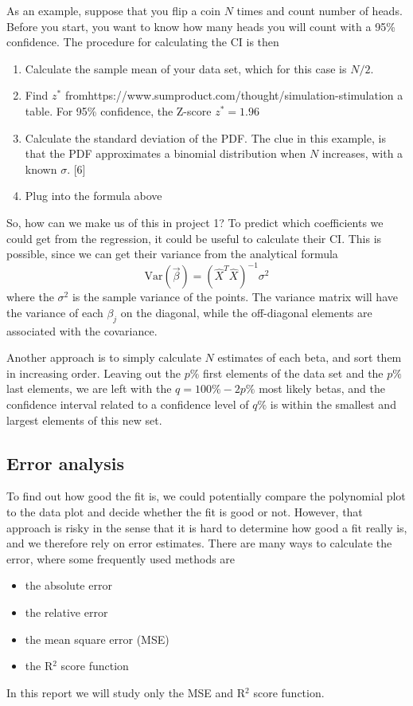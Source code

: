 As an example, suppose that you flip a coin $N$ times and count number of heads. Before you start, you want to know how many heads you will count with a 95\% confidence. The procedure for calculating the CI is then
\begin{enumerate}
	\item Calculate the sample mean of your data set, which for this case is $N/2$.
	\item Find $z^*$ fromhttps://www.sumproduct.com/thought/simulation-stimulation a table. For 95\% confidence, the Z-score $z^*=1.96$
	\item Calculate the standard deviation of the PDF. The clue in this example, is that the PDF approximates a binomial distribution when $N$ increases, with a known $\sigma$. [6]
	\item Plug into the formula above
\end{enumerate}

So, how can we make us of this in project 1? To predict which coefficients we could get from the regression, it could be useful to calculate their CI. This is possible, since we can get their variance from the analytical formula
\begin{equation}
\text{Var}(\vec{\beta})=(\hat{X}^T\hat{X})^{-1}\sigma^2
\end{equation}
where the $\sigma^2$ is the sample variance of the points. The variance matrix will have the variance of each $\beta_j$ on the diagonal, while the off-diagonal elements are associated with the covariance. 

Another approach is to simply calculate $N$ estimates of each beta, and sort them in increasing order. Leaving out the $p\%$ first elements of the data set and the $p\%$ last elements, we are left with the $q=100\%-2p\%$ most likely betas, and the confidence interval related to a confidence level of $q\%$ is within the smallest and largest elements of this new set.

\subsection{Error analysis} \label{sec:error_analysis}
To find out how good the fit is, we could potentially compare the polynomial plot to the data plot and decide whether the fit is good or not. However, that approach is risky in the sense that it is hard to determine how good a fit really is, and we therefore rely on error estimates. There are many ways to calculate the error, where some frequently used methods are
\begin{itemize}
	\item{the absolute error}
	\item{the relative error}
	\item{the mean square error (MSE)}
	\item{the R$^2$ score function}
\end{itemize}
In this report we will study only the MSE and R$^2$ score function.

